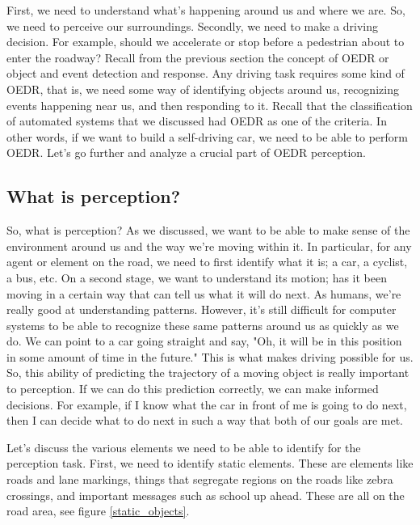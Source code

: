 First, we need to understand what's happening around us and where we are. So, we need to perceive our surroundings. 
Secondly, we need to make a driving decision. For example, should we accelerate or stop before a pedestrian about to enter the roadway? 
Recall from the previous section the concept of OEDR or object and event detection and response. 
Any driving task requires some kind of OEDR, that is, we need some way of identifying objects around us, recognizing events happening near us, and then responding to it. 
Recall that the classification of automated systems that we discussed had OEDR as one of the criteria. 
In other words, if we want to build a self-driving car, we need to be able to perform OEDR. Let's go further and analyze a crucial part of OEDR perception. 

\subsection{What is perception?}
So, what is perception? As we discussed, we want to be able to make sense of the environment around us and the way we're moving within it. 
In particular, for any agent or element on the road, we need to first identify what it is; a car, a cyclist, a bus, etc. 
On a second stage, we want to understand its motion; has it been moving in a certain way that can tell us what it will do next. 
As humans, we're really good at understanding patterns. 
However, it's still difficult for computer systems to be able to recognize these same patterns around us as quickly as we do. 
We can point to a car going straight and say, "Oh, it will be in this position in some amount of time in the future." 
This is what makes driving possible for us. So, this ability of predicting the trajectory of a moving object is really important to perception. 
If we can do this prediction correctly, we can make informed decisions. For example, if I know what the car in front of me is going to do next, 
then I can decide what to do next in such a way that both of our goals are met. 

Let's discuss the various elements we need to be able to identify for the perception task. 
First, we need to identify static elements. These are elements like roads and lane markings, things that segregate regions on the roads like zebra crossings, 
and important messages such as school up ahead. These are all on the road area, see figure \ref{static_objects}.

